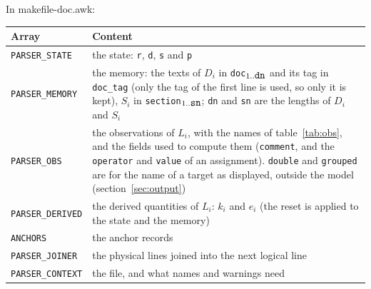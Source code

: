 \documentclass[11pt]{article}
\newcommand{\code}[1]{\mbox{\texttt{#1}}}
\begin{document}
In makefile-doc.awk:

\begin{center}
\begin{tabular}{@{}lP{0.62\textwidth}@{}}
  \toprule
  Array & Content \\
  \midrule
  \code{PARSER\_STATE} & the state: \code{r}, \code{d}, \code{s} and \code{p} \\
  \code{PARSER\_MEMORY} & the memory: the texts of $D_i$ in \code{doc}$_{1..\code{dn}}$ and
                          its tag in \code{doc\_tag} (only the tag of the first line is
                          used, so only it is kept), $S_i$ in
                          \code{section}$_{1..\code{sn}}$; \code{dn} and \code{sn} are the
                          lengths of $D_i$ and $S_i$ \\
  \code{PARSER\_OBS} & the observations of $L_i$, with the names of table~\ref{tab:obs},
                       and the fields used to compute them (\code{comment}, and the
                       \code{operator} and \code{value} of an assignment). \code{double}
                       and \code{grouped} are for the name of a target as displayed,
                       outside the model (section~\ref{sec:output}) \\
  \code{PARSER\_DERIVED} & the derived quantities of $L_i$: $k_i$ and $e_i$ (the reset is
                           applied to the state and the memory) \\
  \code{ANCHORS} & the anchor records \\
  \code{PARSER\_JOINER} & the physical lines joined into the next logical line \\
  \code{PARSER\_CONTEXT} & the file, and what names and warnings need \\
  \bottomrule
\end{tabular}
\end{center}
\end{document}
